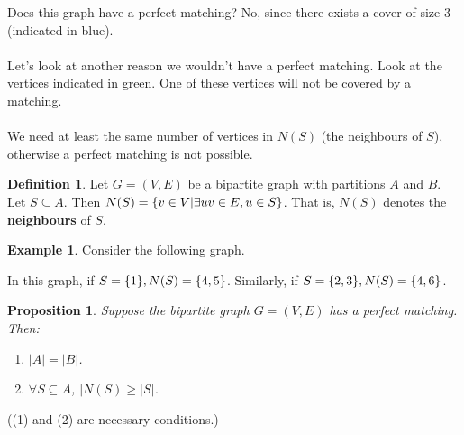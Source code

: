 \documentclass[]{article}
\newtheorem*{proposition}{Proposition}
\theoremstyle{definition}
\newtheorem*{defn}{Definition}
\newtheorem{ex}{Example}[section]
\DeclarePairedDelimiter{\set}{\lbrace}{\rbrace}
\begin{document}
			Does this graph have a perfect matching? No, since there exists a cover of size 3 (indicated in blue).
			\\ \\
			Let's look at another reason we wouldn't have a perfect matching. Look at the vertices indicated in green. One of these vertices will not be covered by a matching.
			\\ \\
			We need at least the same number of vertices in $N(S)$ (the neighbours of $S$), otherwise a perfect matching is not possible.

			\begin{defn}
				Let $G = (V, E)$ be a bipartite graph with partitions $A$ and $B$. Let $S \subseteq A$. Then $N(S) = \set{v \in V | \exists uv \in E, u \in S}$. That is, $N(S)$ denotes the \textbf{neighbours} of $S$.
			\end{defn}

			\begin{ex}
				Consider the following graph.
				\begin{center}
				\end{center}

				In this graph, if $S = \set{1}, N(S) = \set{4, 5}$. Similarly, if $S = \set{2, 3}, N(S) = \set{4, 6}$.
			\end{ex}

			\begin{proposition}
				Suppose the bipartite graph $G = (V, E)$ has a perfect matching. Then:
				\begin{enumerate}
					\item $|A| = |B|$.
					\item $\forall S \subseteq A$, $|N(S) \ge |S|$.
				\end{enumerate}
			\end{proposition}

			((1) and (2) are necessary conditions.)
\end{document}
